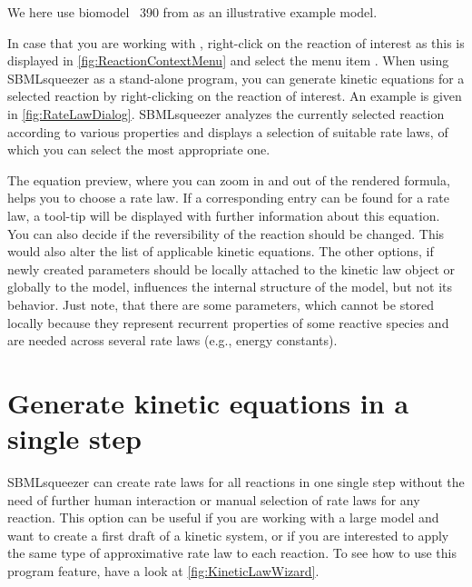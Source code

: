 We here use biomodel \numero~390 from \BioModels \citep{Li2010a, Arnold2011} as an illustrative example model.

In case that you are working with \CellDesigner \citep{Funahashi2003, Funahashi2006, Funahashi2007a, Funahashi2008}, right-click on the reaction of interest as this is displayed in \vref{fig:ReactionContextMenu} and select the menu item .
When using SBMLsqueezer as a stand-alone program, you can generate kinetic equations for a selected reaction by right-clicking on the reaction of interest.
An example is given in \vref{fig:RateLawDialog}.
SBMLsqueezer analyzes the currently selected reaction according to various properties
and displays a selection of suitable rate laws, of which you can select
the most appropriate one.

The equation preview, where you can zoom in and out of the rendered formula, helps you to choose a rate law. If a corresponding \SBO entry can be found for a rate law, a tool-tip will be displayed with further information about this equation.
You can also decide if the reversibility of the reaction should be changed.
This would also alter the list of applicable kinetic equations.
The other options, if newly created
parameters should be locally attached to the kinetic law object or globally to
the model, influences the internal structure of the model, but not its behavior.
Just note, that there are some parameters, which cannot be stored locally because
they represent recurrent properties of some reactive species and are needed
across several rate laws (e.g., energy constants).

\section{Generate kinetic equations in a single step}

SBMLsqueezer can create rate laws for all reactions in one single step without the need of further human interaction or manual selection of rate laws for any reaction.
This option can %
be %
useful if you are working with a large model and want to create a first draft of a kinetic system, or if you are interested to apply the same type of approximative rate law to each reaction.
To see how to use this program feature, have a look at \vref{fig:KineticLawWizard}.

